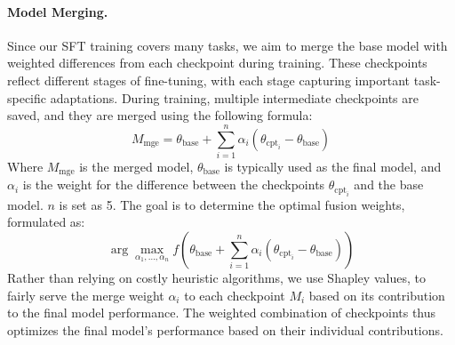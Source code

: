 \paragraph{Model Merging.}
Since our SFT training covers many tasks,  we aim to merge the base model with weighted differences from each checkpoint during training. These checkpoints reflect different stages of fine-tuning, with each stage capturing important task-specific adaptations. During training, multiple intermediate checkpoints are saved, and they are merged using the following formula:
\begin{equation}
M_{\text{mge}} = \theta_{\text{base}} + \sum_{i=1}^{n} \alpha_i (\theta_{\text{cpt}_i} - \theta_{\text{base}})
\end{equation}
Where $M_{\text{mge}}$ is the merged model, \(\theta_{\text{base}}\) is typically used as the final model, and \(\alpha_i\) is the weight for the difference between the checkpoints $\theta_{\text{cpt}_i}$ and the base model. $n$ is set as 5.
The goal is to determine the optimal fusion weights, formulated as:
\begin{equation}
\arg\max_{\alpha_1, \dots, \alpha_n} f( \theta_{\text{base}} + \sum_{i=1}^{n} \alpha_i (\theta_{\text{cpt}_i} - \theta_{\text{base}}))
\end{equation}
Rather than relying on costly heuristic algorithms, we use Shapley values\cite{sundararajan2020many}, to fairly serve the merge weight \(\alpha_i\) to each checkpoint \(M_i\) based on its contribution to the final model performance. The weighted combination of checkpoints thus optimizes the final model's performance based on their individual contributions.

